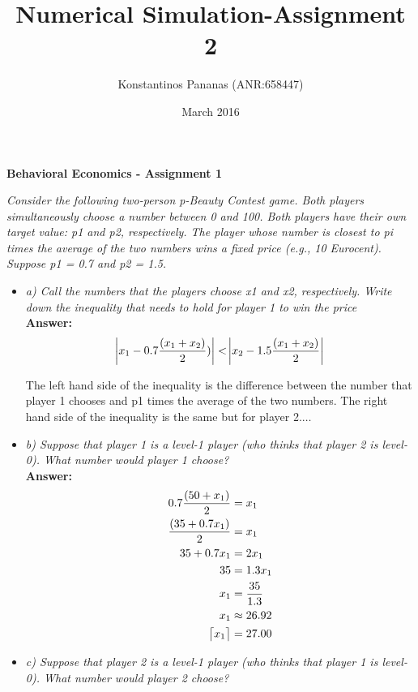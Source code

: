 \documentclass{report}
\title{Numerical Simulation-Assignment 2}
\author{Konstantinos Pananas (ANR:658447) }
\date{March 2016}
\DeclarePairedDelimiter{\ceil}{\lceil}{\rceil}
\begin{document}
\maketitle

\begin{center}
\textbf{\LARGE{Behavioral Economics - Assignment 1}}
\end{center}
\vspace{8mm} 

\textit{Consider the following two-person p-Beauty Contest game. Both players simultaneously choose a number between 0 and 100. Both players have their own target value: p1 and p2, respectively. The player whose number is closest to pi times the average of the two numbers wins a fixed price (e.g., 10 Eurocent). Suppose p1 = 0.7 and p2 = 1.5.}
\bigskip


\begin{itemize}
    \item[] \textit{a) Call the numbers that the players choose x1 and x2, respectively. Write down the inequality that needs to hold for player 1 to win the price}\\

\textbf{Answer:}
$$\abs{x_1 - 0.7 \frac{(x_1 + x_2)}  {2}) } <\abs{  x_2 - 1.5 \frac{(x_1+ x_2 )}{2} }$$
\bigskip

The left hand side of the inequality is the difference between the number that player 1 chooses and p1 times the average of the two numbers. The right hand side of the inequality is the same but for player 2.$\dots$
    \item[]\textit{b) Suppose that player 1 is a level-1 player (who thinks that player 2 is level-0). What number would player 1 choose?}\\

\textbf{Answer:}\\

\begin{align*} 
0.7 \frac{(50 + x_1)}{2} &= x_1 \\ 
\frac{(35 + 0.7x_1)}{2} &= x_1\\
35 + 0.7x_1 &= 2x_1\\
35 &= 1.3x_1\\
x_1 &= \frac{35}{1.3}\\
x_1&\approx26.92\\
\ceil[\big]{x_1}&=27.00
\end{align*}
    \item[]\textit{c) Suppose that player 2 is a level-1 player (who thinks that player 1 is level-0). What number would player 2 choose?}\\


\end{itemize}
\end{document}
